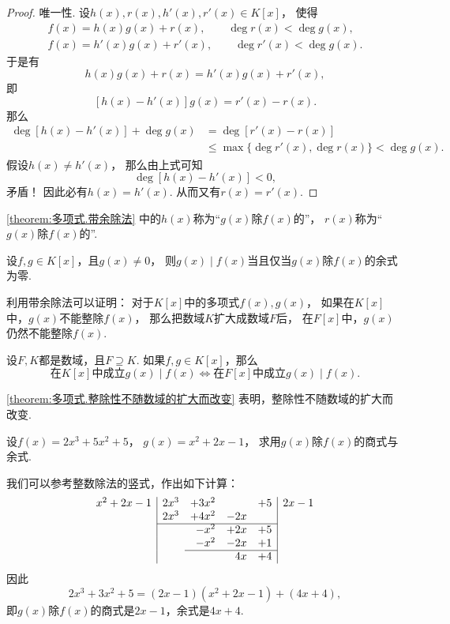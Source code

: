 \begin{theorem}
\begin{proof}
唯一性.
设\(h(x),r(x),h'(x),r'(x) \in K[x]\)，
使得\begin{gather*}
	f(x) = h(x) g(x) + r(x), \qquad \deg r(x) < \deg g(x), \\
	f(x) = h'(x) g(x) + r'(x), \qquad \deg r'(x) < \deg g(x).
\end{gather*}
于是有\[
	h(x) g(x) + r(x)
	= h'(x) g(x) + r'(x),
\]
即\[
	[h(x) - h'(x)] g(x) = r'(x) - r(x).
\]
那么\begin{align*}
	\deg[h(x) - h'(x)] + \deg g(x)
	&= \deg[r'(x) - r(x)] \\
	&\leq \max\{
		\deg r'(x),
		\deg r(x)
	\}
	< \deg g(x).
\end{align*}
假设\(h(x) \neq h'(x)\)，
那么由上式可知\[
	\deg[h(x) - h'(x)] < 0,
\]
矛盾！
因此必有\(h(x) = h'(x)\).
从而又有\(r(x) = r'(x)\).
\end{proof}
\end{theorem}

\cref{theorem:多项式.带余除法} 中的\(h(x)\)称为“\(g(x)\)除\(f(x)\)的”，
\(r(x)\)称为“\(g(x)\)除\(f(x)\)的”.

\begin{corollary}
设\(f,g \in K[x]\)，且\(g(x) \neq 0\)，
则\(g(x) \mid f(x)\)当且仅当\(g(x)\)除\(f(x)\)的余式为零.
\end{corollary}

利用带余除法可以证明：
对于\(K[x]\)中的多项式\(f(x),g(x)\)，
如果在\(K[x]\)中，\(g(x)\)不能整除\(f(x)\)，
那么把数域\(K\)扩大成数域\(F\)后，
在\(F[x]\)中，\(g(x)\)仍然不能整除\(f(x)\).

\begin{proposition}\label{theorem:多项式.整除性不随数域的扩大而改变}
设\(F,K\)都是数域，且\(F \supseteq K\).
如果\(f,g \in K[x]\)，那么\[
	\text{在\(K[x]\)中成立\(g(x) \mid f(x)\)}
	\iff
	\text{在\(F[x]\)中成立\(g(x) \mid f(x)\)}.
\]
\end{proposition}

\cref{theorem:多项式.整除性不随数域的扩大而改变} 表明，整除性不随数域的扩大而改变.

\begin{example}
设\(f(x) = 2x^3+5x^2+5\)，
\(g(x) = x^2+2x-1\)，
求用\(g(x)\)除\(f(x)\)的商式与余式.
\begin{solution}
我们可以参考整数除法的竖式，作出如下计算：
\[
	\begin{array}{r|*4r|l}
		x^2+2x-1 &
		2x^3 & +3x^2 & & +5
		& 2x-1 \\
		& 2x^3 & +4x^2 & -2x & \\ \cline{2-5}
		& & -x^2 & +2x & +5 \\
		& & -x^2 & -2x & +1 \\ \cline{3-5}
		& & & 4x & +4
	\end{array}
\]
因此\[
	2x^3+3x^2+5=(2x-1)(x^2+2x-1)+(4x+4),
\]
即\(g(x)\)除\(f(x)\)的商式是\(2x-1\)，余式是\(4x+4\).
\end{solution}
\end{example}
